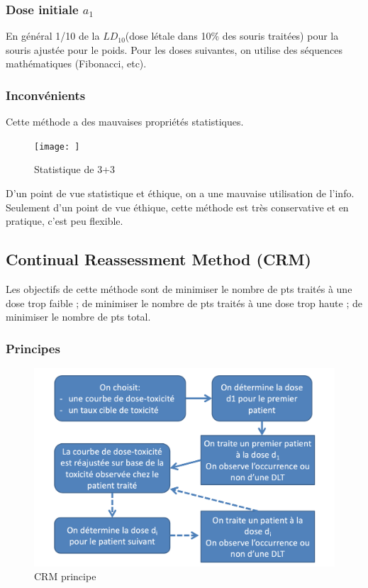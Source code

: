\subsubsection{Dose initiale $a_{1}$}
En général 1/10 de la $LD_{10}$(dose létale dans 10\% des souris traitées) pour la souris ajustée pour le poids. Pour les doses suivantes, on utilise des séquences mathématiques (Fibonacci, etc). 
\subsubsection{Inconvénients}
Cette méthode a des mauvaises propriétés statistiques.
\begin{figure}[H]
    \centering
    \texttt{[image: ]}
    \caption{Statistique de 3+3}
    \label{fig:stat3+3}
\end{figure}
D'un point de vue statistique et éthique, on a une mauvaise utilisation de l’info. Seulement d'un point de vue éthique, cette méthode est très conservative et en pratique, c'est peu flexible.


\subsection{Continual Reassessment Method (CRM)}
Les objectifs de cette méthode sont de minimiser le nombre de pts traités à une dose trop faible ; de minimiser le nombre de pts traités à une dose trop haute ; de minimiser le nombre de pts total.

\subsubsection{Principes}
\begin{figure}[H]
    \centering
    \includegraphics[scale=0.3]{images/CRM.png}
    \caption{CRM principe}
    \label{fig:CRMprincipe}
\end{figure}

